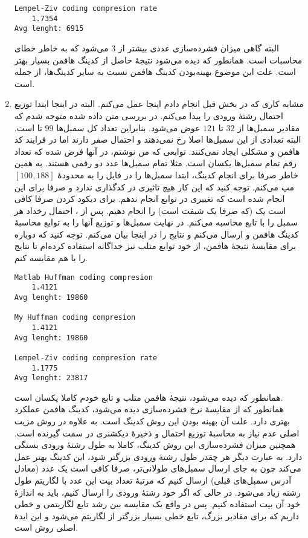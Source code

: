 \documentclass[a4paper]{article}
\begin{document}
\begin{enumerate}[1)]
\begin{latin}
\begin{Verbatim}[frame=single,
				baselinestretch=1.2,
				xleftmargin=1.5cm,
				xrightmargin=1.5cm,
				breaklines=true]
Lempel-Ziv coding compresion rate
    1.7354
Avg lenght: 6915
\end{Verbatim}
\end{latin}
البته گاهی میزان فشرده‌سازی عددی بیشتر از 
$3$
می‌شود که به خاطر خطای محاسبات است. همانطور که دیده می‌شود نتیجۀ حاصل از کدینگ هافمن بسیار بهتر است. علت این موضوع بهینه‌بودن کدینگ هافمن نسبت به سایر کدینگ‌ها، از جمله 
است.
\item مشابه کاری که در بخش قبل انجام دادم اینجا عمل می‌کنم. البته در اینجا ابتدا توزیع احتمال رشتۀ ورودی را پیدا می‌کنم. در بررسی متن داده شده متوجه شدم که مقادیر سمبل‌ها از 
$32$
تا
$121$
عوض می‌شود. بنابراین تعداد کل سمبل‌ها 
$99$
تا است. البته تعدادی از این سمبل‌ها اصلا رخ نمی‌دهند و احتمال صفر دارند اما در فرایند کد هافمن و 
مشکلی ایجاد نمی‌کنند. توابعی که من نوشتم، در آنها فرض شده که تعداد رقم تمام سمبل‌ها یکسان است. مثلا تمام سمبل‌ها عدد دو رقمی هستند. به همین خاطر صرفا برای انجام کدینگ، ابتدا سمبل‌ها را در فایل 
را به محدودۀ 
$[100, 188]$
مپ می‌کنم. توجه کنید که این کار هیچ تاثیری در کدگذاری ندارد و صرفا برای این انجام شده است که تغییری در توابع انجام ندهم. برای دیکود کردن صرفا کافی است یک 
(که صرفا یک شیفت است) را انجام دهیم. پس از 
، 
احتمال رخداد هر سمبل را با تابع 
محاسبه می‌کنم. در نهایت سمبل‌ها و توزیع آنها را به توابع محاسبۀ کدینگ هافمن و 
ارسال می‌کنم و نتایج را در اینجا بیان می‌کنم. توجه کنید که دوباره برای مقایسۀ نتیجۀ هافمن، از خود توابع متلب نیز جداگانه استفاده کرده‌ام تا نتایج را با هم مقایسه کنم.
\begin{latin}
\begin{Verbatim}[frame=single,
				baselinestretch=1.2,
				xleftmargin=1.5cm,
				xrightmargin=1.5cm,
				breaklines=true]
Matlab Huffman coding compresion
    1.4121
Avg lenght: 19860

My Huffman coding compresion
    1.4121
Avg lenght: 19860

Lempel-Ziv coding compresion rate
    1.1775
Avg lenght: 23817
\end{Verbatim}
\end{latin}
همانطور که دیده می‌شود، نتیجۀ هافمن متلب و تابع خودم کاملا یکسان است. \\
همانطور که از مقایسۀ نرخ فشرده‌سازی دیده می‌شود، کدینگ هافمن عملکرد بهتری دارد. علت آن بهینه بودن این روش کدینگ است. به علاوه در روش 
مزیت اصلی عدم نیاز به محاسبۀ توزیع احتمال و ذخیرۀ دیکشنری در سمت گیرنده است. همچنین میزان فشرده‌سازی این روش کدینگ، کاملا به طول رشتۀ ورودی بستگی دارد. به عبارت دیگر هر چقدر طول رشتۀ ورودی بزرگتر شود، این کدینگ بهتر عمل می‌کند چون به جای ارسال سمبل‌های طولانی‌تر، صرفا کافی است یک عدد (معادل آدرس سمبل‌های قبلی) ارسال کنیم که مرتبۀ تعداد بیت این عدد با لگاریتم طول رشته زیاد می‌شود. در حالی که اگر خود رشتۀ ورودی را ارسال کنیم، باید به اندازۀ خود آن بیت استفاده کنیم. پس در واقع یک مقایسه بین رشد تابع لگاریتمی و خطی داریم که برای مقادیر بزرگ، تابع خطی بسیار بزرگتر از لگاریتم می‌شود و این ایدۀ اصلی روش 
است.
\end{enumerate}
\end{document}
